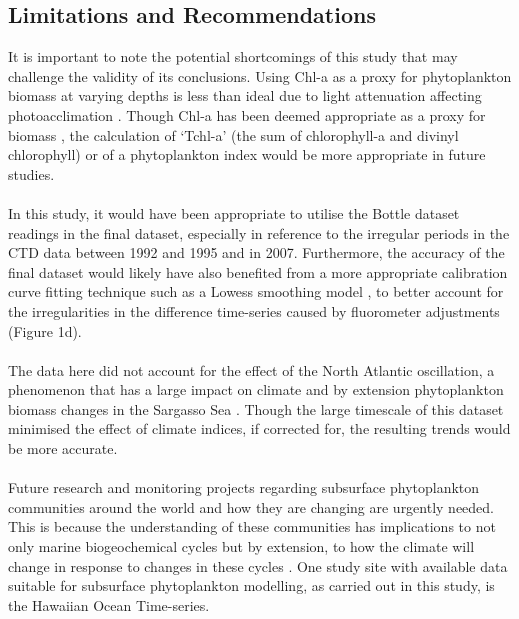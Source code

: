 \documentclass{article}
\begin{document}
\subsection{Limitations and Recommendations}
It is important to note the potential shortcomings of this study that may challenge the validity of its conclusions. Using Chl-a as a proxy for phytoplankton biomass at varying depths is less than ideal due to light attenuation affecting photoacclimation \citep{behrenfeld_beam_2006,geider_dynamic_1996,fennel_subsurface_2003}. Though Chl-a has been deemed appropriate as a proxy for biomass \citep{boyce_global_2010}, the calculation of ‘Tchl-a’ (the sum of chlorophyll-a and divinyl chlorophyll) \citep{huot_does_2007} or of a phytoplankton index \citep{ni_longphuirt_decoupling_2019} would be more appropriate in future studies. \\ \\
In this study, it would have been appropriate to utilise the Bottle dataset readings in the final dataset, especially in reference to the irregular periods in the CTD data between 1992 and 1995 and in 2007. Furthermore, the accuracy of the final dataset would likely have also benefited from a more appropriate calibration curve fitting technique such as a Lowess smoothing model \citep{seabold_statsmodels_2010}, to better account for the irregularities in the difference time-series caused by fluorometer adjustments (Figure 1d). \\ \\
The data here did not account for the effect of the North Atlantic oscillation, a phenomenon that has a large impact on climate and by extension phytoplankton biomass changes in the Sargasso Sea \citep{casey_changes_2013}. Though the large timescale of this dataset minimised the effect of climate indices, if corrected for, the resulting trends would be more accurate.\\ \\
Future research and monitoring projects regarding subsurface phytoplankton communities around the world and how they are changing are urgently needed. This is because the understanding of these communities has implications to not only marine biogeochemical cycles but by extension, to how the climate will change in response to changes in these cycles \citep{ross_blooms_2017,yasunaka_global_2022,friedlingstein_positive_2001}. One study site with available data suitable for subsurface phytoplankton modelling, as carried out in this study, is the Hawaiian Ocean Time-series.
\end{document}
